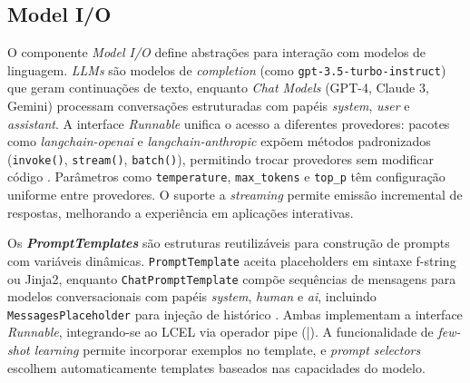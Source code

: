 \documentclass[12pt]{article}
\begin{document}
\subsection{Model I/O}
\label{subsec:model-io}


O componente \textit{Model I/O} define abstrações para interação com modelos de linguagem. \textit{LLMs} são modelos de \textit{completion} (como \texttt{gpt-3.5-turbo-instruct}) que geram continuações de texto, enquanto \textit{Chat Models} (GPT-4, Claude 3, Gemini) processam conversações estruturadas com papéis \textit{system}, \textit{user} e \textit{assistant}. A interface \textit{Runnable} unifica o acesso a diferentes provedores: pacotes como \textit{langchain-openai} e \textit{langchain-anthropic} expõem métodos padronizados (\texttt{invoke()}, \texttt{stream()}, \texttt{batch()}), permitindo trocar provedores sem modificar código \cite{langchain2023docs}. Parâmetros como \texttt{temperature}, \texttt{max\_tokens} e \texttt{top\_p} têm configuração uniforme entre provedores. O suporte a \textit{streaming} permite emissão incremental de respostas, melhorando a experiência em aplicações interativas.


Os \textbf{\textit{PromptTemplates}} são estruturas reutilizáveis para construção de prompts com variáveis dinâmicas. \texttt{PromptTemplate} aceita placeholders em sintaxe f-string ou Jinja2, enquanto \texttt{ChatPromptTemplate} compõe sequências de mensagens para modelos conversacionais com papéis \textit{system}, \textit{human} e \textit{ai}, incluindo \texttt{MessagesPlaceholder} para injeção de histórico \cite{langchain2023docs}. Ambas implementam a interface \textit{Runnable}, integrando-se ao LCEL via operador pipe (|). A funcionalidade de \textit{few-shot learning} permite incorporar exemplos no template, e \textit{prompt selectors} escolhem automaticamente templates baseados nas capacidades do modelo.
\end{document}

